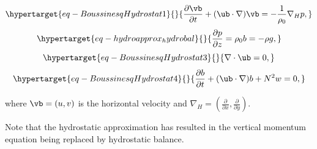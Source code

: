 \documentclass[
  letterpaper,
  twocolumn,
  landscape]{report}
\begin{document}
\begin{tcolorbox}[enhanced jigsaw, left=2mm, opacityback=0, coltitle=black, bottomtitle=1mm, title={\textbf{(Hydrostatic) Boussinesq Equations}}, toprule=.15mm, colbacktitle=quarto-callout-important-color!10!white, breakable, arc=.35mm, titlerule=0mm, colback=white, toptitle=1mm, opacitybacktitle=0.6, rightrule=.15mm, bottomrule=.15mm, colframe=quarto-callout-important-color-frame, leftrule=.75mm]

\begin{equation}\protect\hypertarget{eq-BoussinesqHydrostat1}{}{ \frac{\partial \vb}{\partial t} + (\ub\cdot\nabla)\vb = -\frac{1}{\rho_0}\nabla_H p,}\label{eq-BoussinesqHydrostat1}\end{equation}
\begin{equation}\protect\hypertarget{eq-hydroapprox_hydrobal}{}{   \frac{\partial p}{\partial z}  = \rho_0 b = -\rho g,}\label{eq-hydroapprox_hydrobal}\end{equation}
\begin{equation}\protect\hypertarget{eq-BoussinesqHydrostat3}{}{   \nabla\cdot \ub =0,}\label{eq-BoussinesqHydrostat3}\end{equation}
\begin{equation}\protect\hypertarget{eq-BoussinesqHydrostat4}{}{    \frac{\partial b}{\partial t} + (\ub\cdot\nabla)b +N^2w =0,}\label{eq-BoussinesqHydrostat4}\end{equation}

\end{tcolorbox}

where \(\vb=(u,v)\) is the horizontal velocity and
\(\nabla_H=\left(\frac{\partial}{\partial x}, \frac{\partial}{\partial y}\right)\).

Note that the hydrostatic approximation has resulted in the vertical
momentum equation being replaced by hydrostatic balance.
\end{document}
